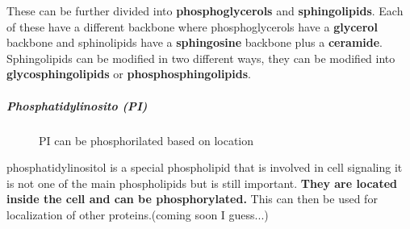 \documentclass[../main.tex]{subfiles}
\begin{document}
        These can be further divided into \textbf{\gls{phosphoglycerols}} and \textbf{\gls{sphingolipids}}. Each of these have a different backbone where phosphoglycerols have a \textbf{ glycerol} backbone and sphinolipids have a \textbf{sphingosine} backbone plus a \textbf{ceramide}. Sphingolipids can be modified in two different ways, they can be modified into \textbf{glycosphingolipids} or \textbf{phosphosphingolipids}.

        \subparagraph{Phosphatidylinosito (PI)}
        \begin{figure}[H]
            \centering
            \hspace{0.05\textwidth} %
            \caption{PI can be phosphorilated based on location}
            \label{fig:ITC_all}
        \end{figure}
        
        \gls{phosphatidylinositol} is a special phospholipid that is involved in cell signaling it is not one of the main phospholipids but is still important. \textbf{They are located inside the cell and can be phosphorylated.}  This can then be used for localization of other proteins.(coming soon I guess...)
        
        
\end{document}
